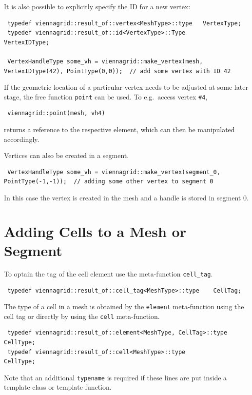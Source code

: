 It is also possible to explicitly specify the ID for a new vertex:
\begin{lstlisting}
 typedef viennagrid::result_of::vertex<MeshType>::type   VertexType;
 typedef viennagrid::result_of::id<VertexType>::Type       VertexIDType;

 VertexHandleType some_vh = viennagrid::make_vertex(mesh, VertexIDType(42), PointType(0,0));  // add some vertex with ID 42
\end{lstlisting}

If the geometric location of a particular vertex needs to be adjusted at some later stage, the free function \lstinline|point| can be used. To e.g.~access vertex \lstinline|#4|,
\begin{lstlisting}
 viennagrid::point(mesh, vh4)
\end{lstlisting}
returns a reference to the respective element, which can then be manipulated accordingly.

Vertices can also be created in a segment.
\begin{lstlisting}
 VertexHandleType some_vh = viennagrid::make_vertex(segment_0, PointType(-1,-1));  // adding some other vertex to segment 0
\end{lstlisting}
In this case the vertex is created in the mesh and a handle is stored in segment 0.


\section{Adding Cells to a Mesh or Segment}
To optain the tag of the cell element use the meta-function \lstinline|cell_tag|.
\begin{lstlisting}
 typedef viennagrid::result_of::cell_tag<MeshType>::type    CellTag;
\end{lstlisting}

The type of a cell in a mesh is obtained by the \lstinline|element| meta-function using the cell tag or directly by using the \lstinline|cell| meta-function.
\begin{lstlisting}
 typedef viennagrid::result_of::element<MeshType, CellTag>::type    CellType;
 typedef viennagrid::result_of::cell<MeshType>::type                CellType;
\end{lstlisting}
Note that an additional \lstinline|typename| is required if these lines are put inside a template class or template function.

